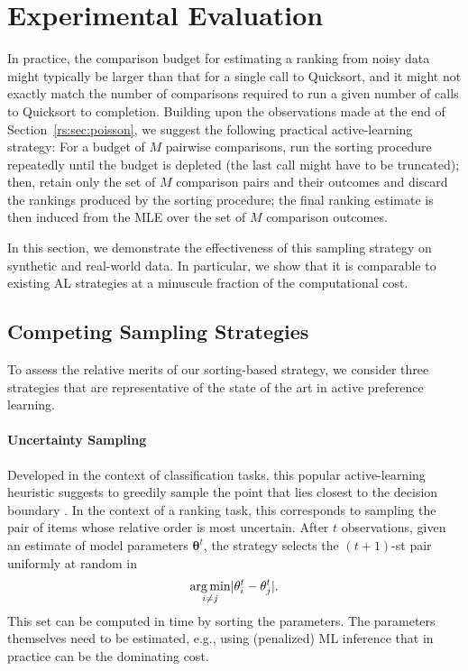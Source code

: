 \section{Experimental Evaluation}  %
\label{rs:sec:experiments}

In practice, the comparison budget for estimating a ranking from noisy data might typically be larger than that for a single call to Quicksort, and it might not exactly match the number of comparisons required to run a given number of calls to Quicksort to completion.
Building upon the observations made at the end of Section~\ref{rs:sec:poisson}, we suggest the following practical active-learning strategy:
For a budget of $M$ pairwise comparisons, run the sorting procedure repeatedly until the budget is depleted (the last call might have to be truncated);
then, retain only the set of $M$ comparison pairs and their outcomes and discard the rankings produced by the sorting procedure;
the final ranking estimate is then induced from the MLE over the set of $M$ comparison outcomes.

In this section, we demonstrate the effectiveness of this sampling strategy on synthetic and real-world data.
In particular, we show that it is comparable to existing AL strategies at a minuscule fraction of the computational cost.


\subsection{Competing Sampling Strategies}

To assess the relative merits of our sorting-based strategy, we consider three strategies that are representative of the state of the art in active preference learning.

\paragraph{Uncertainty Sampling}
Developed in the context of classification tasks, this popular active-learning heuristic suggests to greedily sample the point that lies closest to the decision boundary \citep{settles2012active}.
In the context of a ranking task, this corresponds to sampling the pair of items whose relative order is most uncertain.
After $t$ observations, given an estimate of model parameters $\bm{\theta}^t$, the strategy selects the $(t\!+\!1)$-st pair uniformly at random in
\begin{align*}
\operatorname*{arg\,min}_{i \ne j} \lvert\theta^t_i - \theta^t_j\rvert.
\end{align*}
This set can be computed in time  by sorting the parameters.
The parameters themselves need to be estimated, e.g., using (penalized) ML inference that in practice can be the dominating cost.

